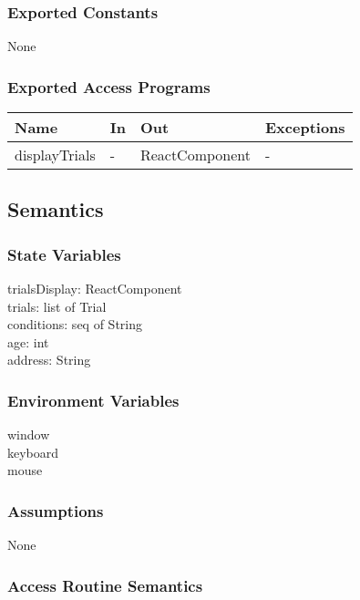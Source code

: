 \documentclass[12pt, titlepage]{article}
\begin{document}
\subsubsection{Exported Constants}
None

\subsubsection{Exported Access Programs}

\begin{center}
\begin{tabular}{p{4cm} p{4cm} p{4cm} p{4cm}}
\hline
\textbf{Name} & \textbf{In} & \textbf{Out} & \textbf{Exceptions} \\
\hline
displayTrials & - & ReactComponent & - \\
\hline
\end{tabular}
\end{center}

\subsection{Semantics}

\subsubsection{State Variables}

trialsDisplay: ReactComponent \\
trials: list of Trial \\
conditions: seq of String \\
age: int \\
address: String

\subsubsection{Environment Variables}

window \\
keyboard \\
mouse

\subsubsection{Assumptions}

None

\subsubsection{Access Routine Semantics}
\end{document}
